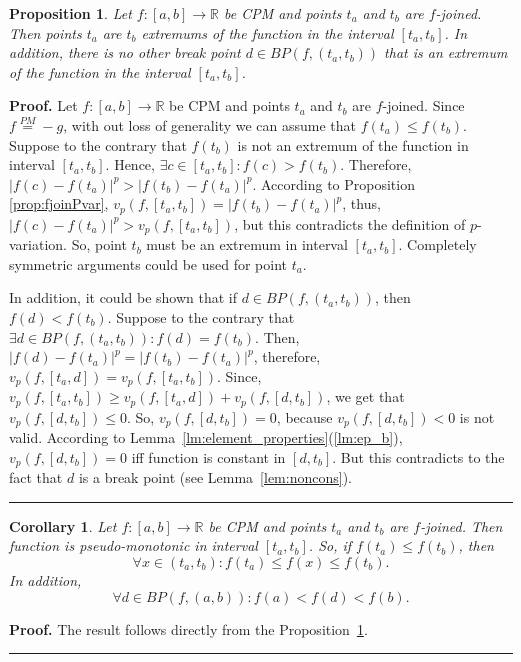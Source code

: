 \documentclass[12pt, a4paper]{article}
\newtheorem{proposition}[theorem]{Proposition}
\newtheorem{corollary}[theorem]{Corollary}
\newenvironment{proof}[1][Proof]{\noindent \textbf{#1.} }{\  \rule{0.5em}{0.5em}}
\numberwithin{equation}{section}
\begin{document}
\begin{proposition}\label{prop:MinMax_in_fjoin}
  Let $f:[a,b] \rightarrow \mathbb{R}$ be CPM and points $t_a$ and $t_b$ are $f$-joined.
  Then points $t_a$ are $t_b$ extremums of the function in the interval $[t_a,t_b]$.
  In addition, there is no other break point $d \in BP(f, (t_a,t_b))$ that
  is an extremum of the function in the interval $[t_a,t_b]$.
\end{proposition}
\begin{proof}
  Let $f:[a,b] \rightarrow \mathbb{R}$ be CPM and points $t_a$ and $t_b$ are $f$-joined.
  Since $f \stackrel{PM}{=} -g$, with out loss of generality we can assume that
  $f(t_a) \leq f(t_b)$.  
  Suppose to the contrary that $f(t_b)$ 
  is not an extremum of the function in interval $[t_a,t_b]$.
  Hence, $\exists c \in [t_a, t_b]: f(c)>f(t_b)$. Therefore,
  $|f(c)-f(t_a)|^p>|f(t_b)-f(t_a)|^p$.
  According to Proposition \ref{prop:fjoinPvar}, 
  $v_p(f,[t_a,t_b])=|f(t_b)-f(t_a)|^p$, 
  thus, $|f(c)-f(t_a)|^p>v_p(f,[t_a,t_b])$,
  but this contradicts the definition of $p$-variation.  
  So, point $t_b$ must be an extremum in interval $[t_a,t_b]$.
  Completely symmetric arguments could be used for point $t_a$.
  
  In addition, it could be shown that if $d \in BP(f, (t_a,t_b))$, then
  $f(d) < f(t_b)$.  
  Suppose to the contrary that $\exists d \in BP(f, (t_a,t_b)): f(d) = f(t_b)$.
  Then, $|f(d)-f(t_a)|^p = |f(t_b)-f(t_a)|^p$, 
  therefore, $v_p(f,[t_a,d])=v_p(f,[t_a,t_b])$.
  Since, $v_p(f,[t_a,t_b]) \geq v_p(f,[t_a,d])+v_p(f,[d,t_b])$, 
  we get that $v_p(f,[d,t_b]) \leq 0$. 
  So, $v_p(f,[d,t_b]) = 0$, because $v_p(f,[d,t_b]) < 0$ is not valid.
  According to Lemma~\ref{lm:element_properties}(\ref{lm:ep_b}), $v_p(f,[d,t_b]) = 0$ iff function is constant in $[d,t_b]$.
  But this contradicts to the fact that $d$ is a break point (see Lemma~\ref{lem:noncons}).  
\end{proof}
\begin{corollary}\label{cor:pseudo-monotonic}
  Let $f:[a,b] \rightarrow \mathbb{R}$ be CPM and points $t_a$ and $t_b$ are $f$-joined.
  Then function is pseudo-monotonic in interval $[t_a,t_b]$. 
  So, if $f(t_a) \leq f(t_b)$, then
  \begin{equation}
    \forall x \in (t_a,t_b): f(t_a) \leq f(x) \leq f(t_b).
  \end{equation}
  In addition,  
  \begin{equation}
    \forall d \in BP(f,(a,b)):f(a)<f(d)<f(b) .
  \end{equation}
\end{corollary}
\begin{proof}
  The result follows directly from the Proposition~\ref{prop:MinMax_in_fjoin}. 
\end{proof}
\end{document}
